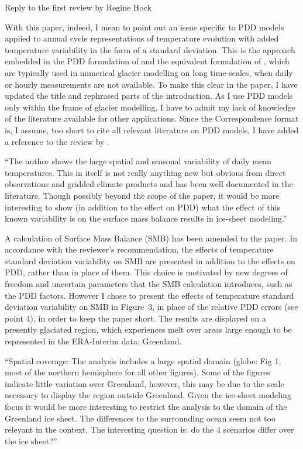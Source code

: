 \documentclass{letter}
\newcommand{\rev}[0]{\color{blue!50!black}\it}
\newcommand{\revpoint}[1]{{\rev\item``#1''}}
\begin{document}
\begin{letter}{Reply to the first review by Regine Hock}
\begin{enumerate}[resume]
    With this paper, indeed, I mean to point out an issue specific to PDD models applied to annual cycle representations of temperature evolution with added temperature variability in the form of a standard deviation. This is the approach embedded in the PDD formulation of \citet{calov-greve-2005} and the equivalent formulation of \citet{reeh-1991}, which are typically used in numerical glacier modelling on long time-scales, when daily or hourly measurements are not available. To make this clear in the paper, I have updated the title and rephrased parts of the introduction. As I use PDD models only within the frame of glacier modelling, I have to admit my lack of knowledge of the literature available for other applications. Since the Correspondence format is, I assume, too short to cite all relevant literature on PDD models, I have added a reference to the review by \citet{hock-2003}.

    \revpoint{The author shows the large spatial and seasonal variability of daily mean temperatures. This in itself is not really anything new but obvious from direct observations and gridded climate products and has been well documented in the literature. Though possibly beyond the scope of the paper, it would be more interesting to show (in addition to the effect on PDD) what the effect of this known variability is on the surface mass balance results in ice-sheet modeling.}

    A calculation of Surface Mass Balance (SMB) has been amended to the paper. In accordance with the reviewer's recommendation, the effects of temperature standard deviation variability on SMB are presented in addition to the effects on PDD, rather than in place of them. This choice is motivated by new degrees of freedom and uncertain parameters that the SMB calculation introduces, such as the PDD factors. However I chose to present the effects of temperature standard deviation variability on SMB in Figure~3, in place of the relative PDD errors (see point 4), in order to keep the paper short. The results are displayed on a presently glaciated region, which experiences melt over areas large enough to be represented in the ERA-Interim data: Greenland.

    \revpoint{Spatial coverage: The analysis includes a large spatial domain (globe: Fig 1, most of the northern hemisphere for all other figures). Some of the figures indicate little variation over Greenland, however, this may be due to the scale necessary to display the region outside Greenland. Given the ice-sheet modeling focus it would be more interesting to restrict the analysis to the domain of the Greenland ice sheet. The differences to the surrounding ocean seem not too relevant in the context. The interesting question is: do the 4 scenarios differ over the ice sheet?}


\end{enumerate}
\end{letter}
\end{document}
